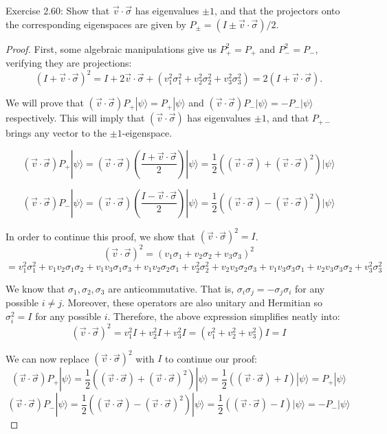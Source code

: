 \begin{problem}
	Exercise 2.60: Show that $\vec{v} \cdot \vec{\sigma}$ has eigenvalues $\pm 1$, and that the projectors onto the corresponding eigenspaces are given by $P_{ \pm}=(I \pm \vec{v} \cdot \vec{\sigma}) / 2$.
\end{problem}
\begin{proof}
	First, 
some algebraic manipulations give us $P_+^2 =  P_+$ and $P_-^2 = P_-$, verifying they are projections:
\[
	(I + \vec{v} \cdot \vec{\sigma} )^2 = I + 2 \vec{v} \cdot \vec{\sigma}  + (v_1^2 \sigma_1^2 + v_2^2\sigma_2^2 + v_3^2\sigma_3^2) = 2 (I + \vec{v}  \cdot \vec{\sigma} )
.\] 


We will prove that \((\vec{v} \cdot \vec{\sigma}) P_+ |\psi\rangle = P_+ |\psi\rangle\) and \((\vec{v} \cdot \vec{\sigma}) P_- |\psi\rangle = -P_- |\psi\rangle\) respectively. This will imply that $(\vec{v}  \cdot  \vec{\sigma} )$ has eigenvalues $\pm 1$, and that $P_{+ -}$ brings any vector to the $\pm 1$-eigenspace. 

\[ (\vec{v} \cdot \vec{\sigma}) P_+ |\psi\rangle = (\vec{v} \cdot \vec{\sigma}) \left(\frac{I + \vec{v} \cdot \vec{\sigma}}{2}\right)|\psi\rangle = \frac{1}{2}((\vec{v} \cdot \vec{\sigma}) + (\vec{v} \cdot \vec{\sigma})^2)|\psi\rangle \]

\[ (\vec{v} \cdot \vec{\sigma}) P_- |\psi\rangle = (\vec{v} \cdot \vec{\sigma}) \left(\frac{I - \vec{v} \cdot \vec{\sigma}}{2}\right)|\psi\rangle = \frac{1}{2}((\vec{v} \cdot \vec{\sigma}) - (\vec{v} \cdot \vec{\sigma})^2)|\psi\rangle \]

In order to continue this proof, we show that \((\vec{v} \cdot \vec{\sigma})^2 = I\).
\[ (\vec{v} \cdot \vec{\sigma})^2 = (v_1 \sigma_1 + v_2 \sigma_2 + v_3 \sigma_3)^2 \]
\[ = v_1^2 \sigma_1^2 + v_1 v_2 \sigma_1 \sigma_2 + v_1 v_3 \sigma_1 \sigma_3 + v_1 v_2 \sigma_2 \sigma_1 + v_2^2 \sigma_2^2 + v_2 v_3 \sigma_2 \sigma_3 + v_1 v_3 \sigma_3 \sigma_1 + v_2 v_3 \sigma_3 \sigma_2 + v_3^2 \sigma_3^2 \]

We know that \(\sigma_1, \sigma_2, \sigma_3\) are anticommutative. That is, \(\sigma_i \sigma_j = - \sigma_j \sigma_i\) for any possible \(i \neq j\). Moreover, these operators are also unitary and Hermitian so \(\sigma_i^2 = I\) for any possible \(i\). Therefore, the above expression simplifies neatly into:
\[ (\vec{v} \cdot \vec{\sigma})^2 = v_1^2 I + v_2^2 I + v_3^2 I = (v_1^2 + v_2^2 + v_3^2) I = I \]

We can now replace \((\vec{v} \cdot \vec{\sigma})^2\) with \(I\) to continue our proof:
\[ (\vec{v} \cdot \vec{\sigma}) P_+ |\psi\rangle = \frac{1}{2}((\vec{v} \cdot \vec{\sigma}) + (\vec{v} \cdot \vec{\sigma})^2)|\psi\rangle = \frac{1}{2}((\vec{v} \cdot \vec{\sigma}) + I)|\psi\rangle = P_+ |\psi\rangle \]
\[ (\vec{v} \cdot \vec{\sigma}) P_- |\psi\rangle = \frac{1}{2}((\vec{v} \cdot \vec{\sigma}) - (\vec{v} \cdot \vec{\sigma})^2)|\psi\rangle = \frac{1}{2}((\vec{v} \cdot \vec{\sigma}) - I)|\psi\rangle = - P_- |\psi\rangle \]


\end{proof}
